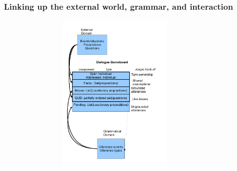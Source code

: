 \documentclass{beamer}
\newcommand{\bit}{\begin{itemize}}
\newcommand{\eit}{\end{itemize}}
\newcommand{\ignore}[1]{}
\begin{document}
\begin{frame}\frametitle{Linking up the external world, grammar, and interaction}

\includegraphics[height=8cm,width=12cm]{sum2.pdf}

\end{frame}
\ignore{
\begin{frame}\frametitle{Type Theory with Records (TTR) }
\bit

\item For this purpose we will use Type Theory with Records (TTR). 

\item TTR is a formalism that allows
us to incorporate insights from Situation Semantics, Montague
Semantics, Discourse Representation Theory,  Head-driven Phrase
Structure Grammar, and Semantic Frame Theory. 

\item We will show how it
can be used to model semantic ontologies, interaction, and to write
dialogically-oriented grammars.


\eit
\end{frame}
}
\ignore{
\begin{frame}\frametitle{Pay Off [delete?]}
\bit

\item \textcolor[rgb]{0.98,0.00,0.00}{Conversation from micro (disfluencies) to macro (conversational genres, multilogue)}
\item \textcolor[rgb]{0.98,0.00,0.00}{Conversation: Opening, middle game, ending }
\item \textcolor[rgb]{0.98,0.00,0.00}{Empirical benchmarks for NSUs and metacommunication from corpus
  studies on the British National Corpus, child language data}
\item New perspective on traditional semantic concerns:
\textcolor[rgb]{0.98,0.00,0.00}{negation},  quantification, anaphora, 
\item \textcolor[rgb]{0.98,0.00,0.00}{Detailed theory of relevance}, which allows us also to talk about Gricean
  {\it irrelevance}.
\eit
\end{frame}
}
\end{document}
